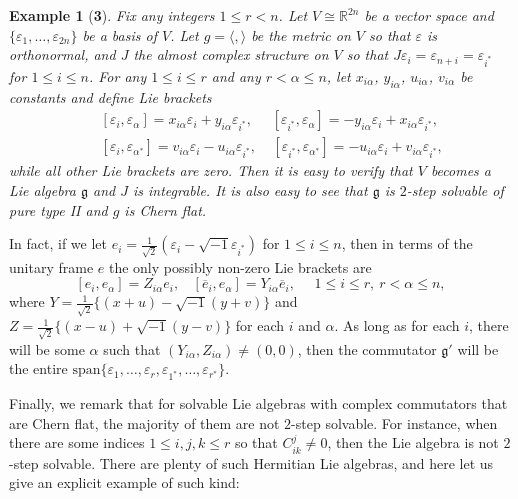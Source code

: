 \documentclass{amsart}
\newtheorem*{example}{Example}
\begin{document}
\begin{example}[{\bf 3}]
Fix any integers $1\leq r<n$. Let $V\cong {\mathbb R}^{2n}$ be a vector space and $\{ \varepsilon_1, \ldots , \varepsilon_{2n}\}$ be a basis of $V$. Let $g=\langle ,\rangle$ be the metric on $V$ so that $\varepsilon$ is orthonormal, and $J$ the almost complex structure on $V$ so that $J\varepsilon_i = \varepsilon_{n+i}=\varepsilon_{i^{\ast}}$ for $1\leq i\leq n$. For any $1\leq i\leq r$ and any $r<\alpha \leq n$, let $x_{i\alpha}$, $y_{i\alpha}$, $u_{i\alpha}$, $v_{i\alpha}$ be constants and define Lie brackets 
\begin{eqnarray*}
&&  [\varepsilon_i, \varepsilon_{\alpha}] = x_{i\alpha} \varepsilon_i + y_{i\alpha} \varepsilon_{i^{\ast}},  \ \ \ \ \ \ [\varepsilon_{i^{\ast}}, \varepsilon_{\alpha}] = -y_{i\alpha} \varepsilon_i + x_{i\alpha} \varepsilon_{i^{\ast}}, \\
&& [\varepsilon_i, \varepsilon_{\alpha^{\ast}}] = v_{i\alpha} \varepsilon_i -u_{i\alpha} \varepsilon_{i^{\ast}},  \ \ \ \ \ [\varepsilon_{i^{\ast}}, \varepsilon_{\alpha^{\ast}}] = -u_{i\alpha} \varepsilon_i + v_{i\alpha} \varepsilon_{i^{\ast}},
\end{eqnarray*}
while all other Lie brackets are zero. Then it is easy to verify that $V$ becomes a Lie algebra ${\mathfrak g}$ and $J$ is integrable. It is also easy to see that ${\mathfrak g}$ is $2$-step solvable of pure type II and $g$ is Chern flat.
\end{example}

In fact, if we let $e_i=\frac{1}{\sqrt{2}}(\varepsilon_i - \sqrt{-1}\varepsilon_{i^{\ast}})$ for $1\leq i\leq n$, then in terms of the unitary frame $e$ the only possibly non-zero Lie brackets are
$$ [e_i, e_{\alpha}] = Z_{i\alpha} e_i, \ \ \ \ [\overline{e}_i, e_{\alpha}] = Y_{i\alpha} \overline{e}_i, \ \ \ \ \ \ 1\leq i\leq r, \ r<\alpha \leq n, $$
where $Y=\frac{1}{\sqrt{2}}\{ (x+u)-\sqrt{-1}(y+v)\}$ and $Z=\frac{1}{\sqrt{2}}\{ (x-u)+\sqrt{-1}(y-v)\}$ for each $i$ and $\alpha$. As long as for each $i$, there will be some $\alpha$ such that $(Y_{i\alpha}, Z_{i\alpha})\neq (0,0)$, then the commutator ${\mathfrak g}'$ will be the entire $\mbox{span}\{ \varepsilon_1, \ldots , \varepsilon_r, \varepsilon_{1^{\ast}}, \ldots , \varepsilon_{r^{\ast}}\}$. 

Finally, we remark that for solvable Lie algebras with complex commutators that are Chern flat, the majority of them are not $2$-step solvable. For instance, when there are some indices $1\leq i,j,k\leq r$ so that $C^j_{ik}\neq 0$, then the Lie algebra is not $2$-step solvable. There are plenty of such Hermitian Lie algebras, and here let us give an explicit example of such kind:
 
\end{document}
